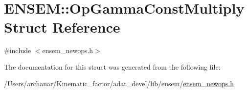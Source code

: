 \hypertarget{structENSEM_1_1OpGammaConstMultiply}{}\section{E\+N\+S\+EM\+:\+:Op\+Gamma\+Const\+Multiply Struct Reference}
\label{structENSEM_1_1OpGammaConstMultiply}


{\ttfamily \#include $<$ensem\+\_\+newops.\+h$>$}



The documentation for this struct was generated from the following file\+:\begin{DoxyCompactItemize}
\item 
/\+Users/archanar/\+Kinematic\+\_\+factor/adat\+\_\+devel/lib/ensem/\mbox{\hyperlink{lib_2ensem_2ensem__newops_8h}{ensem\+\_\+newops.\+h}}\end{DoxyCompactItemize}
